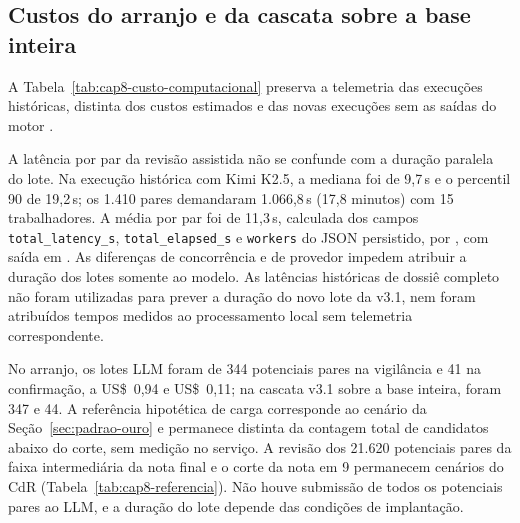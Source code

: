 \subsection{Custos do arranjo e da cascata sobre a base inteira}
\label{sec:e4-custo-computacional}

A Tabela~\ref{tab:cap8-custo-computacional} preserva a telemetria das execuções históricas, distinta dos custos estimados e das novas execuções sem as saídas do motor \cite{Jardim2026phdrepo}.

\begin{table}[!ht]
\centering
\caption{Latência e duração observadas das execuções de vigilância com dossiê completo (incluindo as saídas decisórias do motor) e instruções v3 (versão histórica que solicita essas saídas).}
\label{tab:cap8-custo-computacional}
\end{table}

A latência por par da revisão assistida não se confunde com a duração paralela do lote. Na execução histórica com Kimi K2.5, a mediana foi de 9,7\,s e o percentil 90 de 19,2\,s; os 1.410 pares demandaram 1.066,8\,s (17,8 minutos) com 15 trabalhadores. A média por par foi de 11,3\,s, calculada dos campos \texttt{total\_latency\_s}, \texttt{total\_elapsed\_s} e \texttt{workers} do JSON persistido, por , com saída em . As diferenças de concorrência e de provedor impedem atribuir a duração dos lotes somente ao modelo. As latências históricas de dossiê completo não foram utilizadas para prever a duração do novo lote da v3.1, nem foram atribuídos tempos medidos ao processamento local sem telemetria correspondente.

No arranjo, os lotes LLM foram de 344 potenciais pares na vigilância e 41 na confirmação, a US\$~0,94 e US\$~0,11; na cascata v3.1 sobre a base inteira, foram 347 e 44. A referência hipotética de carga corresponde ao cenário da Seção~\ref{sec:padrao-ouro} e permanece distinta da contagem total de candidatos abaixo do corte, sem medição no serviço. A revisão dos 21.620 potenciais pares da faixa intermediária da nota final e o corte da nota em 9 permanecem cenários do CdR (Tabela~\ref{tab:cap8-referencia}). Não houve submissão de todos os potenciais pares ao LLM, e a duração do lote depende das condições de implantação.

